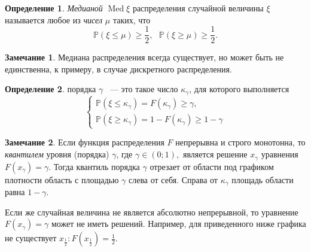 \documentclass[oneside,final,14pt]{extreport}
\newcommand\myprob[1]{{\mathbb{P}(#1)}}
\theoremstyle{plain}
\theoremstyle{definition}
\newtheorem*{defn}{Определение}
\newtheorem*{rmrk}{Замечание}
\theoremstyle{named}
\begin{document}
\begin{defn}
    {\it Медианой} $\operatorname{Med} \xi$ распределения случайной величины $\xi$ называется любое из {\it чисел} $\mu$ таких, что
    \begin{equation*}
        \myprob{\xi \leqslant \mu} \geqslant \frac{1}{2}, ~~~ \myprob{\xi \geqslant \mu} \geqslant \frac{1}{2}.
    \end{equation*}
\end{defn} 

\begin{rmrk}
    Медиана распределения всегда существует, но может быть не единственна, к примеру, в случае дискретного распределения.
\end{rmrk} 

\begin{defn}
{  порядка $\gamma$} ~--- это такое число $\kappa_\gamma$, для которого выполняется 
$$ \begin{cases} \myprob{\xi \leqslant \kappa_\gamma} = F(\kappa_\gamma) \geqslant \gamma, \\
\myprob{\xi \geqslant \kappa_\gamma} = 1 - F(\kappa_\gamma) \geqslant 1 - \gamma \end{cases}
$$
\end{defn}

\begin{rmrk}
    Если функция распределения $F$ непрерывна и строго монотонна, то {\it квантилем} уровня (порядка) $\gamma$, где $\gamma \in (0; 1), $ является решение $x_\gamma$ уравнения $F(x_\gamma) = \gamma.$ 
    Тогда квантиль порядка $\gamma$ отрезает от области под графиком плотности область с площадью $\gamma$ слева от себя. Справа от $\kappa_\gamma$ площадь области равна $1 - \gamma$.
    
    Если же случайная величина не является абсолютно непрерывной, то уравнение $F(x_\gamma) = \gamma$ может не иметь решений. Например, для приведенного ниже графика не существует $x_{\frac{1}{2}}: F(x_{\frac{1}{2}}) = \frac{1}{2}$.
        
    \medskip\hfill\break
    \begin{center}
    \end{center}
\end{rmrk} 
\end{document}
